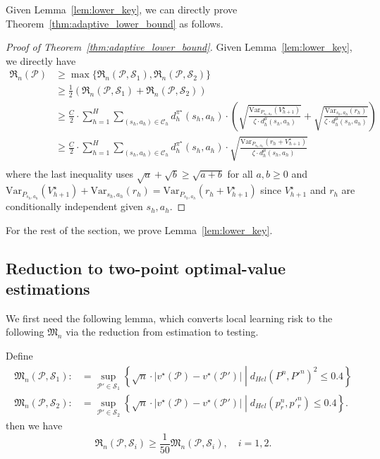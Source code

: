 Given Lemma~\ref{lem:lower_key}, we can directly prove Theorem~\ref{thm:adaptive_lower_bound} as follows.

\begin{proof}[Proof of Theorem~\ref{thm:adaptive_lower_bound}]
	Given Lemma~\ref{lem:lower_key}, we directly have 
	\begin{align*}
	\mathfrak{R}_{n}(\mathcal{P})&\geq \max\{\mathfrak{R}_{n}(\mathcal{P},\mathcal{S}_1),\mathfrak{R}_{n}(\mathcal{P},\mathcal{S}_2)\}\\
	&\geq \frac{1}{2}\left(\mathfrak{R}_{n}(\mathcal{P},\mathcal{S}_1)+\mathfrak{R}_{n}(\mathcal{P},\mathcal{S}_2)\right)\\
	&\geq \frac{C}{2}\cdot \sum_{h=1}^H\sum_{(s_h,a_h)\in\mathcal{C}_h}d^{\pi^\star}_h(s_h,a_h)\cdot\left(\sqrt{\frac{\mathrm{Var}_{P_{s_h,a_h}}(V^\star_{h+1})}{\zeta\cdot  d^\mu_h{(s_h,a_h)}}}+\sqrt{\frac{\mathrm{Var}_{{s_h,a_h}}(r_{h})}{ \zeta\cdot d^\mu_h{(s_h,a_h)}}}\right)\\
	&\geq \frac{C}{2}\cdot \sum_{h=1}^H\sum_{(s_h,a_h)\in\mathcal{C}_h}d^{\pi^\star}_h(s_h,a_h)\cdot\sqrt{\frac{\mathrm{Var}_{P_{s_h,a_h}}(r_h+V^\star_{h+1})}{\zeta\cdot  d^\mu_h{(s_h,a_h)}}}\\
	\end{align*} 
	where the last inequality uses $\sqrt{a}+\sqrt{b}\geq \sqrt{a+b}$ for all $a,b\geq 0$ and $\mathrm{Var}_{P_{s_h,a_h}}(V^\star_{h+1})+\mathrm{Var}_{{s_h,a_h}}(r_h)=\mathrm{Var}_{P_{s_h,a_h}}(r_h+V^\star_{h+1})$ since $V^\star_{h+1}$ and $r_h$ are conditionally independent given $s_h,a_h$.
\end{proof}

For the rest of the section, we prove Lemma~\ref{lem:lower_key}.


\subsection{Reduction to two-point optimal-value estimations}

We first need the following lemma, which converts local learning risk to the following $\mathfrak{M}_n$ via the reduction from estimation to testing.

\begin{lemma}\label{lem:risk_bound}
	Define 
	\begin{align*}
	\mathfrak{M}_n(\mathcal{P},\mathcal{S}_1):&=\sup_{\mathcal{P}'\in\mathcal{S}_1}\left\{\sqrt{n}\cdot |v^\star(\mathcal{P})-v^\star(\mathcal{P}')|\middle| d_{Hel}(P^n,P'^n)^2\leq 0.4\right\}\\
	\mathfrak{M}_n(\mathcal{P},\mathcal{S}_2):&=\sup_{\mathcal{P}'\in\mathcal{S}_2}\left\{\sqrt{n}\cdot |v^\star(\mathcal{P})-v^\star(\mathcal{P}')|\middle| d_{Hel}(p_r^n,p'^n_r)\leq 0.4\right\}.
	\end{align*}
	then we have 
	\[
	\mathfrak{R}_n(\mathcal{P},\mathcal{S}_i)\geq \frac{1}{50}\mathfrak{M}_n(\mathcal{P},\mathcal{S}_i), \quad i=1,2.
	\]
\end{lemma}

